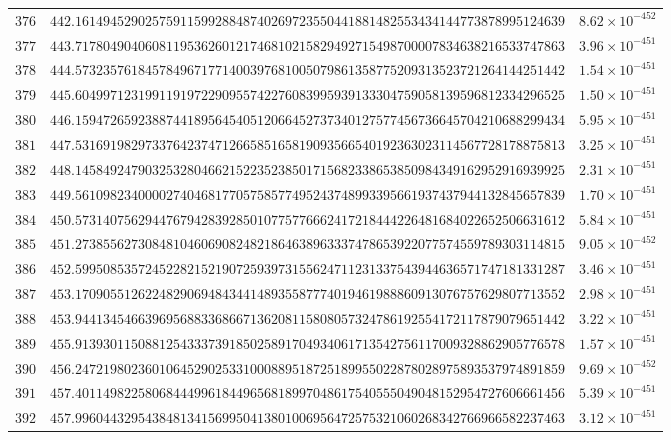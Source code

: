 \documentclass[12pt,reqno]{amsart}
\theoremstyle{remark}
\begin{document}
\begin{longtable}{clc}
$376$ & $442.1614945290257591159928848740269723550441881482553434144773878995124639$ & $8.62\times 10^{-452}$ \\
$377$ & $443.7178049040608119536260121746810215829492715498700007834638216533747863$ & $3.96\times 10^{-451}$ \\
$378$ & $444.5732357618457849671771400397681005079861358775209313523721264144251442$ & $1.54\times 10^{-451}$ \\
$379$ & $445.6049971231991191972290955742276083995939133304759058139596812334296525$ & $1.50\times 10^{-451}$ \\
$380$ & $446.1594726592388744189564540512066452737340127577456736645704210688299434$ & $5.95\times 10^{-451}$ \\
$381$ & $447.5316919829733764237471266585165819093566540192363023114567728178875813$ & $3.25\times 10^{-451}$ \\
$382$ & $448.1458492479032532804662152235238501715682338653850984349162952916939925$ & $2.31\times 10^{-451}$ \\
$383$ & $449.5610982340000274046817705758577495243748993395661937437944132845657839$ & $1.70\times 10^{-451}$ \\
$384$ & $450.5731407562944767942839285010775776662417218444226481684022652506631612$ & $5.84\times 10^{-451}$ \\
$385$ & $451.2738556273084810460690824821864638963337478653922077574559789303114815$ & $9.05\times 10^{-452}$ \\
$386$ & $452.5995085357245228215219072593973155624711231337543944636571747181331287$ & $3.46\times 10^{-451}$ \\
$387$ & $453.1709055126224829069484344148935587774019461988860913076757629807713552$ & $2.98\times 10^{-451}$ \\
$388$ & $453.9441345466396956883368667136208115808057324786192554172117879079651442$ & $3.22\times 10^{-451}$ \\
$389$ & $455.9139301150881254333739185025891704934061713542756117009328862905776578$ & $1.57\times 10^{-451}$ \\
$390$ & $456.2472198023601064529025331000889518725189955022878028975893537974891859$ & $9.69\times 10^{-452}$ \\
$391$ & $457.4011498225806844499618449656818997048617540555049048152954727606661456$ & $5.39\times 10^{-451}$ \\
$392$ & $457.9960443295438481341569950413801006956472575321060268342766966582237463$ & $3.12\times 10^{-451}$ \\

\end{longtable}
\end{document}
